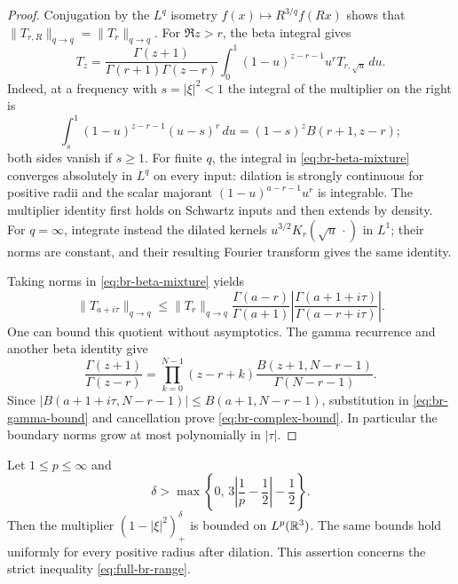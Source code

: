 \begin{proof}
Conjugation by the $L^q$ isometry $f(x)\mapsto R^{3/q}f(Rx)$ shows
that $\|T_{r,R}\|_{q\to q}=\|T_r\|_{q\to q}$.  For $\Re z>r$,
the beta integral gives
\begin{equation}\label{eq:br-beta-mixture}
 T_z=\frac{\Gamma(z+1)}{\Gamma(r+1)\Gamma(z-r)}
 \int_0^1(1-u)^{z-r-1}u^rT_{r,\sqrt u}\,du.
\end{equation}
Indeed, at a frequency with $s=|\xi|^2<1$ the integral of the
multiplier on the right is
\[
 \int_s^1(1-u)^{z-r-1}(u-s)^r\,du
 =(1-s)^z B(r+1,z-r);
\]
both sides vanish if $s\ge1$.  For finite $q$, the integral in
\eqref{eq:br-beta-mixture} converges absolutely in $L^q$ on every
input: dilation is strongly continuous for positive radii and the
scalar majorant $(1-u)^{a-r-1}u^r$ is integrable.  The multiplier
identity first holds on Schwartz inputs and then extends by density.
For $q=\infty$, integrate instead the dilated kernels
$u^{3/2}K_r(\sqrt u\,\cdot)$ in $L^1$; their norms are constant,
and their resulting Fourier transform gives the same identity.

Taking norms in \eqref{eq:br-beta-mixture} yields
\begin{equation}\label{eq:br-gamma-bound}
 \|T_{a+i\tau}\|_{q\to q}
 \le \|T_r\|_{q\to q}
 \frac{\Gamma(a-r)}{\Gamma(a+1)}
 \left|\frac{\Gamma(a+1+i\tau)}{\Gamma(a-r+i\tau)}\right|.
\end{equation}
One can bound this quotient without asymptotics.  The gamma recurrence
and another beta identity give
\[
 \frac{\Gamma(z+1)}{\Gamma(z-r)}
 =\prod_{k=0}^{N-1}(z-r+k)
 \frac{B(z+1,N-r-1)}{\Gamma(N-r-1)}.
\]
Since $|B(a+1+i\tau,N-r-1)|\le B(a+1,N-r-1)$, substitution in
\eqref{eq:br-gamma-bound} and cancellation prove
\eqref{eq:br-complex-bound}.  In particular the boundary norms grow
at most polynomially in $|\tau|$.
\end{proof}

\begin{corollary}
\label{cor:full-bochner-riesz}
Let $1\le p\le\infty$ and
\begin{equation}\label{eq:full-br-range}
 \delta>\max\left\{0,\,3\left|\frac1p-\frac12\right|-\frac12\right\}.
\end{equation}
Then the multiplier $(1-|\xi|^2)_+^\delta$ is bounded on
$L^p(\mathbb R^3)$.  The same bounds hold uniformly for every positive
radius after dilation.  This assertion concerns the strict
inequality \eqref{eq:full-br-range}.
\end{corollary}

